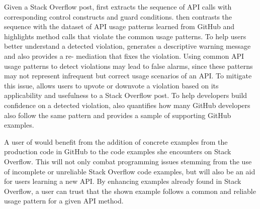 Given a Stack Overflow post, {\tool} first extracts the sequence of API calls with corresponding control constructs and guard conditions. {\tool} then contrasts the sequence with the dataset of API usage patterns learned from GitHub and highlights method calls that violate the common usage patterns. To help users better understand a detected violation, {\tool} generates a descriptive warning message and also provides a re-
mediation that fixes the violation. Using common API usage patterns to detect violations may lead to false alarms, since these patterns may not represent infrequent but correct usage scenarios of an API. To mitigate this issue, {\tool} allows users to upvote or downvote a violation based on its applicability and usefulness to a Stack Overflow post. To help developers build confidence on a detected violation, {\tool} also quantifies how many GitHub developers also follow the same pattern and provides a sample of supporting GitHub examples.

A user of {\tool} would benefit from the addition of concrete examples from the production code in GitHub  to the code examples she encounters on Stack Overflow. This will not only combat programming issues stemming from the use of incomplete or unreliable Stack Overflow code examples, but will also be an aid for users learning a new API. By enhancing examples already found in Stack Overflow, a user can trust that the shown example follows a common and reliable usage pattern for a given API method.

%
